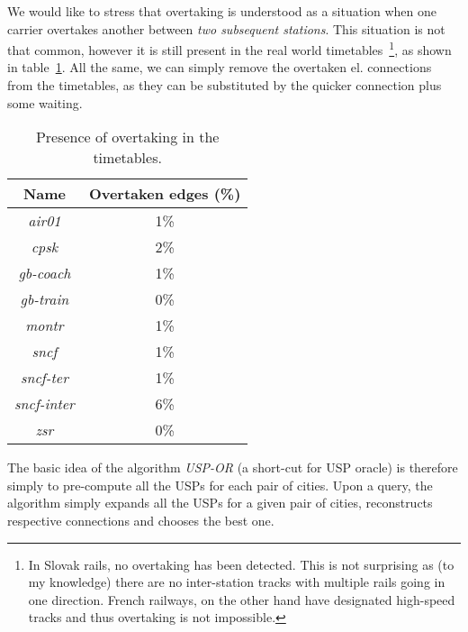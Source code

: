     \noindent We would like to stress that overtaking is understood as a situation when one carrier overtakes another between \textit{two subsequent stations}. This situation is not that common, however it is still present in the real world timetables~\footnote{In Slovak rails, no overtaking has been detected. This is not surprising as (to my knowledge) there are no inter-station tracks with multiple rails going in one direction. French railways, on the other hand have designated high-speed tracks and thus overtaking is not impossible.}, as shown in table~\ref{tab:overtake}. All the same, we can simply remove the overtaken el. connections from the timetables, as they can be substituted by the quicker connection plus some waiting. \\
    
    \begin{table}[h!]
    	\centering
		\begin{tabular}{c|c}
            \rowcolor{tablehead}
        	\textbf{Name} & \textbf{Overtaken edges (\%)} \\
			\hline
			\textit{air01} & 1\% \\
			\textit{cpsk} & 2\% \\
			\textit{gb-coach} & 1\% \\
			\textit{gb-train} & 0\% \\
			\textit{montr} & 1\% \\
			\textit{sncf} & 1\% \\
			\textit{sncf-ter} & 1\% \\
			\textit{sncf-inter} & 6\% \\
			\textit{zsr} & 0\% \\
		\end{tabular}
		\caption{\label{tab:overtake} Presence of overtaking in the timetables.}
	\end{table}
	
	\noindent The basic idea of the algorithm \textit{USP-OR} (a short-cut for USP oracle) is therefore simply to pre-compute all the USPs for each pair of cities. Upon a query, the algorithm simply expands all the USPs for a given pair of cities, reconstructs respective connections and chooses the best one. \\
	
